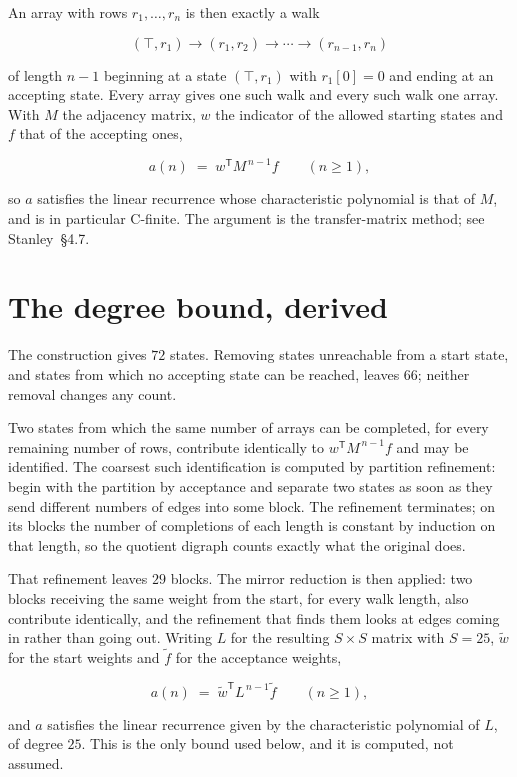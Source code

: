 \documentclass[11pt]{article}
\theoremstyle{definition}
\begin{document}
An array with rows $r_1,\dots,r_n$ is then exactly a walk

\[(\top,r_1) \to (r_1,r_2) \to \cdots \to (r_{n-1},r_n)\]

of length $n-1$ beginning at a state $(\top,r_1)$ with $r_1[0]=0$ and ending at an accepting state. Every array gives one such walk and every such walk one array. With $M$ the adjacency matrix, $w$ the indicator of the allowed starting states and $f$ that of the accepting ones,

\[a(n) \;=\; w^{\mathsf T} M^{\,n-1} f \qquad (n \ge 1),\]

so $a$ satisfies the linear recurrence whose characteristic polynomial is that of $M$, and is in particular C-finite. The argument is the transfer-matrix method; see Stanley~\S4.7.

\section{The degree bound, derived}

The construction gives $72$ states. Removing states unreachable from a start state, and states from which no accepting state can be reached, leaves $66$; neither removal changes any count.

Two states from which the same number of arrays can be completed, for every remaining number of rows, contribute identically to $w^{\mathsf T}M^{\,n-1}f$ and may be identified. The coarsest such identification is computed by partition refinement: begin with the partition by acceptance and separate two states as soon as they send different numbers of edges into some block. The refinement terminates; on its blocks the number of completions of each length is constant by induction on that length, so the quotient digraph counts exactly what the original does.

That refinement leaves $29$ blocks. The mirror reduction is then applied: two blocks receiving the same weight from the start, for every walk length, also contribute identically, and the refinement that finds them looks at edges coming in rather than going out. Writing $L$ for the resulting $S \times S$ matrix with $S = 25$, $\tilde w$ for the start weights and $\tilde f$ for the acceptance weights,

\[a(n) \;=\; \tilde w^{\mathsf T} L^{\,n-1} \tilde f \qquad (n \ge 1),\]

and $a$ satisfies the linear recurrence given by the characteristic polynomial of $L$, of degree $25$. This is the only bound used below, and it is computed, not assumed.
\end{document}
